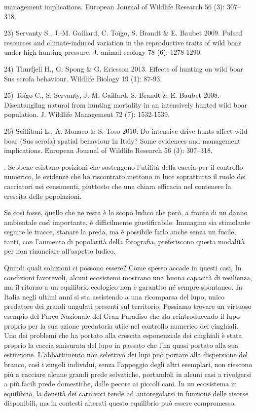 \documentclass[12pt]{book} %
\begin{document}
\begin{mdframed}[linewidth=1pt]
{management implications. European Journal of Wildlife Research 56 (3): 307–318.\par 23) Servanty S., J.-M. Gaillard, C.
Toïgo, S. Brandt \& E. Baubet 2009. Pulsed resources and climate-induced variation in the reproductive traits of wild
boar under high hunting pressure. J. animal ecology 78 (6): 1278-1290.\par 24) Thurfjell H., G. Spong \& G. Ericsson
2013. Effects of hunting on wild boar Sus scrofa behaviour. Wildlife Biology 19 (1): 87-93.\par 25) Toïgo C., S.
Servanty, J.-M. Gaillard, S. Brandt \& E. Baubet 2008. Disentangling natural from hunting mortality in an intensively
hunted wild boar population. J. Wildlife Management 72 (7): 1532-1539.\par 26) Scillitani L., A. Monaco \& S. Toso
2010. Do intensive drive hunts affect wild boar (Sus scrofa) spatial behaviour in Italy? Some evidences and management
implications. European Journal of Wildlife Research 56 (3): 307–318. }. Sebbene esistano posizioni che sostengono l'utilità della caccia per il controllo numerico, le evidenze che ho riscontrato mettono in luce soprattutto il ruolo dei cacciatori nei censimenti, piuttosto che una chiara efficacia nel contenere la crescita delle popolazioni. 

Se così fosse, quello che ne resta è lo scopo ludico che però, a fronte di un danno
ambientale così importante, è difficilmente giustificabile. Immagino sia stimolante seguire le tracce, stanare la preda, ma è
possibile farlo anche senza un fucile, tanti, con l'aumento di popolarità della fotografia, preferiscono questa modalità per non rinunciare all'aspetto ludico.

Quindi quali soluzioni ci possono essere? Come spesso accade in questi casi, In condizioni favorevoli, alcuni ecosistemi mostrano una buona capacità di resilienza, ma il ritorno a un equilibrio ecologico non è garantito né sempre spontaneo. In Italia negli ultimi anni si sta assistendo a una ricomparsa del
lupo, unico predatore dei grandi ungulati presenti sul territorio. Possiamo trovare un virtuoso esempio del Parco
Nazionale del Gran Paradiso che sta reintroducendo il lupo proprio per la sua azione predatoria utile nel controllo
numerico dei cinghiali. Uno dei problemi che ha portato alla crescita esponenziale dei cinghiali è stata proprio la
caccia smisurata del lupo in passato che l'ha quasi portato alla sua estinzione.
L’abbattimento non selettivo dei lupi può portare alla dispersione del branco, così i singoli individui, senza l'appoggio degli altri esemplari, non riescono più a cacciare alcune grandi prede selvatiche, portandoli in alcuni casi a rivolgersi a più facili prede domestiche, dalle
pecore ai piccoli cani. In un ecosistema in equilibrio, la densità dei carnivori tende ad autoregolarsi in funzione delle risorse disponibili, ma in contesti alterati questo equilibrio può essere compromesso.


\end{mdframed}
\end{document}
